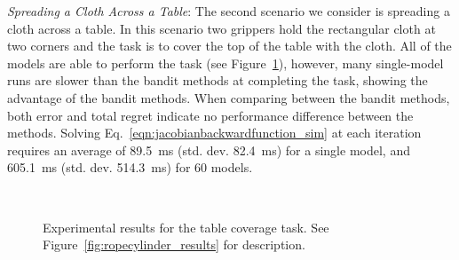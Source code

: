 \textit{Spreading a Cloth Across a Table}: The second scenario we consider is spreading a cloth across a table. In this scenario two grippers hold the rectangular cloth at two corners and the task is to cover the top of the table with the cloth. All of the models are able to perform the task (see Figure~\ref{fig:clothtable_results}), however, many single-model runs are slower than the bandit methods at completing the task, showing the advantage of the bandit methods. When comparing between the bandit methods, both error and total regret indicate no performance difference between the methods. Solving Eq.~\eqref{eqn:jacobianbackwardfunction_sim} at each iteration requires an average of 89.5~ms (std. dev. 82.4~ms) for a single model, and 605.1~ms (std. dev. 514.3~ms) for 60 models.


\begin{figure}[h]
    \centering
    \\
    \caption{Experimental results for the table coverage task. See Figure~\ref{fig:ropecylinder_results} for description.}
    \label{fig:clothtable_results}
\end{figure}


